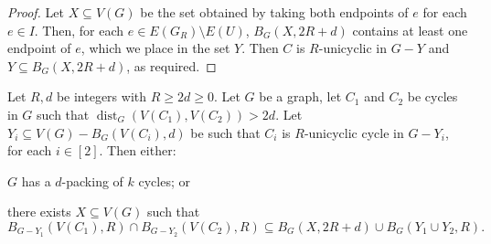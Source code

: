 \documentclass{patmorin}
\DeclareMathOperator{\dist}{dist}
\begin{document}
\begin{proof}
  Let $X\subseteq V(G)$ be the set obtained by taking both endpoints of $e$ for each $e\in I$.  Then, for each $e\in E(G_R)\setminus E(U)$, $B_G(X,2R+d)$ contains at least one endpoint of $e$, which we place in the set $Y$.  Then $C$ is $R$-unicyclic in $G-Y$ and $Y\subseteq B_G(X,2R+d)$, as required.
\end{proof}


\begin{lem}\label{double_unicycle}
  Let $R,d$ be integers with $R\geq 2d\geq 0$.
  Let $G$ be a graph,
  let $C_1$ and $C_2$ be cycles in $G$ such that
  $\dist_G(V(C_1),V(C_2))>2d$.
  Let $Y_i\subseteq V(G) - B_G(V(C_i),d)$ be such that $C_i$ is $R$-unicyclic cycle in $G-Y_i$,
  for each $i\in[2]$.
  Then either:
  \begin{compactenum}[(a)]
    \item $G$ has a $d$-packing of $k$ cycles; or
    \item there exists $X\subseteq V(G)$ such that \[
    B_{G-Y_1}(V(C_1),R)\cap B_{G-Y_2}(V(C_2),R) \subseteq B_G(X,2R+d) \cup B_G(Y_1\cup Y_2,R).
    \]
  \end{compactenum}
\end{lem}
\end{document}
